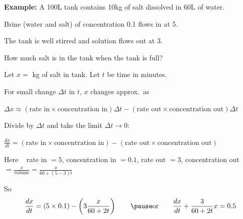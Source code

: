 \documentclass[10pt,aspectratio=169]{beamer}
\begin{document}
\begin{frame}

\textbf{Example:}
A 100L tank contains 10kg of salt dissolved in 60L of water.

Brine (water and salt) of concentration 0.1
flows in at 5.

The tank is well stirred and solution flows out at 3.

\vspace*{-0.45in}
\hspace*{4.5in}

\vspace*{-1.04in}

\pause
How much salt is in the tank when the tank is full?

\medskip
\pause

Let $x =$ kg of salt in tank.
\pause
Let $t$ be time in minutes.

\medskip
\pause

For small change $\Delta t$ in $t$, $x$ changes approx.\ as

\medskip

\quad$\displaystyle
\Delta x \approx
(\text{rate in} \times \text{concentration in}) \Delta t - 
(\text{rate out} \times \text{concentration out}) \Delta t$

\medskip
\pause

Divide by $\Delta t$ and take the limit
$\Delta t \to 0$:

\medskip

\quad$\displaystyle
\frac{dx}{dt} =
(\text{rate in} \times \text{concentration in})  - 
(\text{rate out} \times \text{concentration out})$

\medskip
\pause

Here ~ rate in $=5$,
concentration in $ = 0.1$,
rate out $ = 3$,
concentration out $ = \frac{x}{\text{volume}} = \frac{x}{60+(5-3)t}$

\medskip
\pause
So
\[
\frac{dx}{dt} =
(5 \times 0.1)  - 
\left(3 \frac{x}{60+2t}\right)
\qquad
\pause
\text{or}
\qquad
\frac{dx}{dt} +
\frac{3}{60+2t} x
=
0.5
\]
\end{frame}
\end{document}
